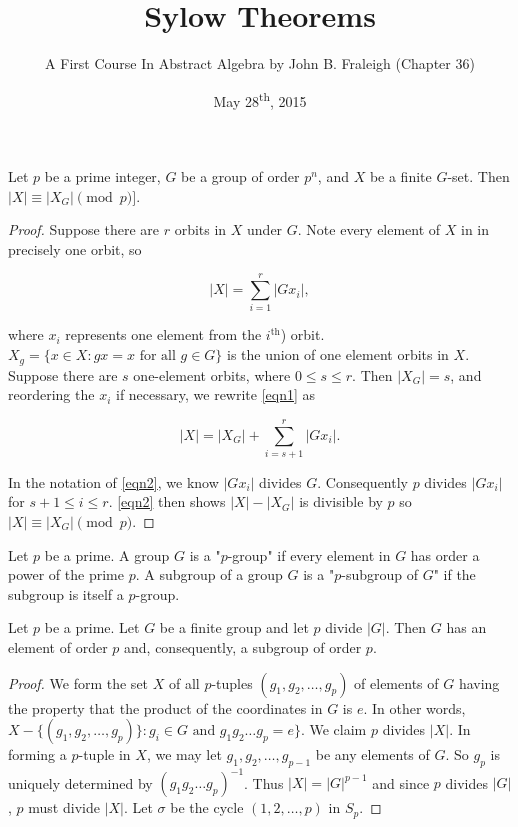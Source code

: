 \documentclass[a4paper,11pt]{article}
\title{Sylow Theorems}
\author{A First Course In Abstract Algebra by John B. Fraleigh (Chapter 36)}
\date{May 28\textsuperscript{th}, 2015}
\begin{document}
\maketitle
{}

\begin{outline}

    Let \(p\) be a prime integer, \(G\) be a group of order \(p^n\), and \(X\) be a finite \(G\)-set. Then 
    \(|X| \equiv |X_G| \pmod{p}]\).
    
    \begin{proof}
      Suppose there are \(r\) orbits in \(X\) under \(G\). Note every element of \(X\) in in precisely one orbit, so
      
      \begin{equation}
        \label{eqn1}
        |X| = \sum_{i=1}^{r} |Gx_i|, 
      \end{equation}
      
      where \(x_i\) represents one element from the \(i^{\text{th}}\)) orbit. \(X_{g} = \{x \in X: gx = x \text{ for all }
      g \in G\}\) is the union of one element orbits in \(X\). Suppose there are \(s\) one-element orbits, where \(0 \leq
      s \leq r\). Then \(|X_G| = s\), and reordering the \(x_i\) if necessary, we rewrite \eqref{eqn1} as 
      
      \begin{equation}
        \label{eqn2}
        |X| = |X_G| + \sum_{i=s+1}^r |Gx_i|.
      \end{equation}
      
      In the notation of \eqref{eqn2}, we know \(|Gx_i|\) divides \(G\). Consequently \(p\) divides \(|Gx_i|\) for
      \(s + 1 \leq i \leq r\). \eqref{eqn2} then shows \(|X| - |X_G|\) is divisible by \(p\) so \(|X| \equiv |X_G|
      \pmod{p}\).
    \end{proof}

    Let \(p\) be a prime. A group \(G\) is a "\(p\)-group" if every element in \(G\) has order a power
    of the prime \(p\). A subgroup of a group \(G\) is a "\(p\)-subgroup of \(G\)" if the subgroup is 
    itself a \(p\)-group.

    Let \(p\) be a prime. Let \(G\) be a finite group and let \(p\) divide \(|G|\). Then \(G\) has an 
    element of order \(p\) and, consequently, a subgroup of order \(p\).
    
    \begin{proof}
      We form the set \(X\) of all \(p\)-tuples \((g_1, g_2, \ldots, g_p)\) of elements of \(G\) having the property that
      the product of the coordinates in \(G\) is \(e\). In other words, \(X - \{(g_1, g_2, \ldots, g_p)\}: g_i \in G 
      \text{ and } g_1g_2\ldots g_p = e\}\). We claim \(p\) divides \(|X|\). In forming a \(p\)-tuple in \(X\), we may
      let \(g_1, g_2, \ldots, g_{p-1}\) be any elements of \(G\). So \(g_p\) is uniquely determined by \((g_1g_2 \ldots 
      g_p)^{-1}\). Thus \(|X| = |G|^{p-1}\) and since \(p\) divides \(|G|\), \(p\) must divide \(|X|\). Let \(\sigma\)
      be the cycle \((1, 2, \ldots, p)\) in \(S_p\).
      

\end{proof}
\end{outline}
\end{document}

